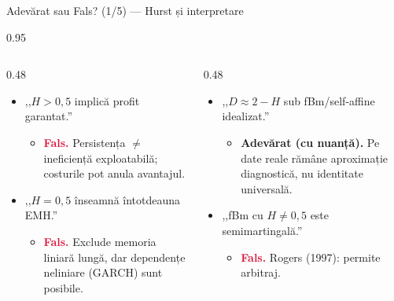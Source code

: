 \documentclass[9pt, aspectratio=169, t]{beamer}
\begin{document}
\begin{frame}[shrink=15]{Adevărat sau Fals? (1/5) --- Hurst și interpretare}
\begin{cminipage}{0.95\textwidth}
\begin{columns}[T]
\begin{column}{0.48\textwidth}
\begin{itemize}\setlength{\itemsep}{2pt}
    \item ,,$H>0{,}5$ implică profit garantat.''
    \begin{itemize}\setlength{\itemsep}{0pt}
        \item[] \textcolor{Crimson}{\textbf{Fals.}} Persistența $\neq$ ineficiență exploatabilă; costurile pot anula avantajul.
    \end{itemize}
    \item ,,$H=0{,}5$ înseamnă întotdeauna EMH.''
    \begin{itemize}\setlength{\itemsep}{0pt}
        \item[] \textcolor{Crimson}{\textbf{Fals.}} Exclude memoria liniară lungă, dar dependențe neliniare (GARCH) sunt posibile.
    \end{itemize}
\end{itemize}
\end{column}
\begin{column}{0.48\textwidth}
\begin{itemize}\setlength{\itemsep}{2pt}
    \item ,,$D\approx 2-H$ sub fBm/self-affine idealizat.''
    \begin{itemize}\setlength{\itemsep}{0pt}
        \item[] \textcolor{Forest}{\textbf{Adevărat (cu nuanță).}} Pe date reale rămâne aproximație diagnostică, nu identitate universală.
    \end{itemize}
    \item ,,fBm cu $H\neq 0{,}5$ este semimartingală.''
    \begin{itemize}\setlength{\itemsep}{0pt}
        \item[] \textcolor{Crimson}{\textbf{Fals.}} Rogers (1997): permite arbitraj.
    \end{itemize}
\end{itemize}
\end{column}
\end{columns}
\end{cminipage}
\end{frame}
\end{document}
